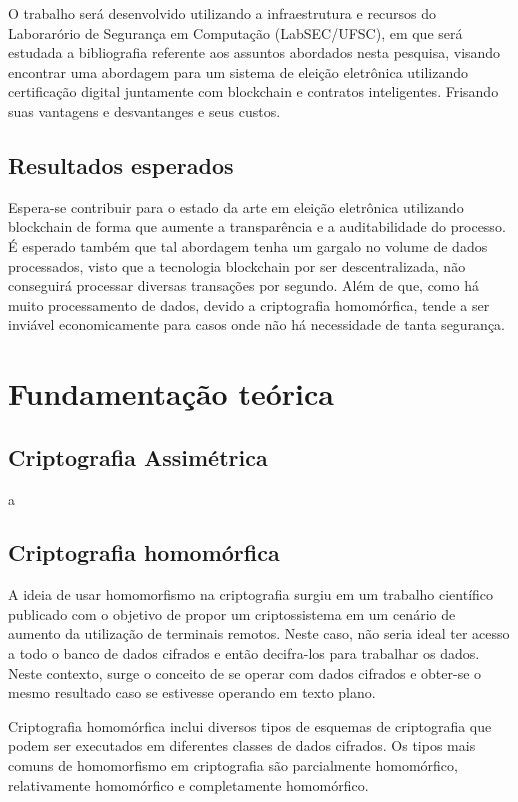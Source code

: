 \documentclass{ufsctex/ufsctex}
\begin{document}
O trabalho será desenvolvido utilizando a infraestrutura e recursos do
Laborarório de Segurança em Computação (LabSEC/UFSC), em que será estudada
a bibliografia referente aos assuntos abordados nesta pesquisa, visando
encontrar uma abordagem para um sistema de eleição eletrônica utilizando
certificação digital juntamente com blockchain e contratos inteligentes.
Frisando suas vantagens e desvantanges e seus custos.

\section{Resultados esperados}

Espera-se contribuir para o estado da arte em eleição eletrônica utilizando
blockchain de forma que aumente a transparência e a auditabilidade do
processo. É esperado também que tal abordagem tenha um gargalo no volume de
dados processados, visto que a tecnologia blockchain por ser descentralizada,
não conseguirá processar diversas transações por segundo. Além de que,
como há muito processamento de dados, devido a criptografia homomórfica,
tende a ser inviável economicamente para casos onde não há necessidade de
tanta segurança.

\chapter{Fundamentação teórica}

\section{Criptografia Assimétrica}
a\cite{cryptoschool}

\section{Criptografia homomórfica}

A ideia de usar homomorfismo na criptografia surgiu em um trabalho científico
publicado com o objetivo de propor um criptossistema em um cenário de aumento da utilização
de terminais remotos. Neste caso, não seria ideal ter acesso a todo o banco de dados
cifrados e então decifra-los para trabalhar os dados. Neste contexto, surge o conceito
de se operar com dados cifrados e obter-se o mesmo resultado caso se estivesse operando em
texto plano.\cite{homomorphic}

Criptografia homomórfica inclui diversos tipos de esquemas de criptografia que podem
ser executados em diferentes classes de dados cifrados. Os tipos mais comuns de homomorfismo
em criptografia são parcialmente homomórfico, relativamente homomórfico e completamente
homomórfico.\cite{survey-homo}
\end{document}
